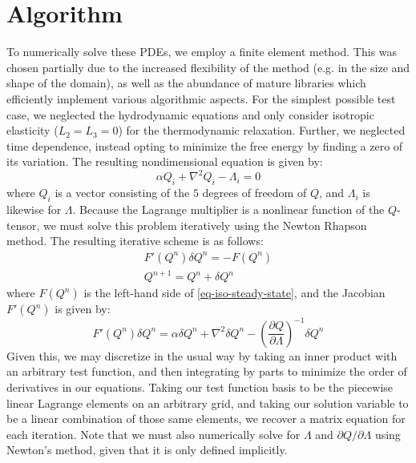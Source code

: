 \documentclass[reqno]{article}
\begin{document}
\section{Algorithm}
To numerically solve these PDEs, we employ a finite element method.
This was chosen partially due to the increased flexibility of the method (e.g.
in the size and shape of the domain), as well as the abundance of mature
libraries which efficiently implement various algorithmic aspects. 
For the simplest possible test case, we neglected the hydrodynamic equations and
only consider isotropic elasticity ($L_2 = L_3 = 0$) for the thermodynamic
relaxation.
Further, we neglected time dependence, instead opting to minimize the free
energy by finding a zero of its variation.
The resulting nondimensional equation is given by:
\begin{equation} \label{eq-iso-steady-state}
  \alpha Q_i + \nabla^2 Q_i - \Lambda_i = 0
\end{equation}
where $Q_i$ is a vector consisting of the $5$ degrees of freedom of $Q$, and
$\Lambda_i$ is likewise for $\Lambda$.
Because the Lagrange multiplier is a nonlinear function of the $Q$-tensor, we
must solve this problem iteratively using the Newton Rhapson method.
The resulting iterative scheme is as follows:
\begin{equation}
  \begin{split}
    F'(Q^n) \delta Q^n = -F(Q^n) \\
    Q^{n + 1} = Q^n + \delta Q^n
  \end{split}
\end{equation}
where $F(Q^n)$ is the left-hand side of \eqref{eq-iso-steady-state}, and the
Jacobian $F'(Q^n)$ is given by:
\begin{equation}
  F'(Q^n) \delta Q^n
  =
  \alpha \delta Q^n
  + \nabla^2 \delta Q^n
  - \left(
    \frac{\partial Q}{\partial \Lambda}
  \right)^{-1}
  \delta Q^n
\end{equation}
Given this, we may discretize in the usual way by taking an
inner product with an arbitrary test function, and then integrating by parts to
minimize the order of derivatives in our equations.
Taking our test function basis to be the piecewise linear Lagrange elements on
an arbitrary grid, and taking our solution variable to be a linear combination
of those same elements, we recover a matrix equation for each iteration.
Note that we must also numerically solve for $\Lambda$ and $\partial Q /
\partial \Lambda$ using Newton's method, given that it is only defined implicitly.
\end{document}
